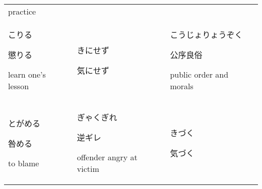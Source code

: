 \documentclass[12pt, a4j, landscape, dvipdfmx]{utarticle}
\begin{document}
\begin{minipage}[t][0pt]{\linewidth }
\begin{tabular}{||p{5.5cm}||p{5.5cm}||p{5.5cm}||}
            {\small practice}\tabularnewline
            \hhline{|:=::=::=:|} \rule{0pt}{3ex}
            \hspace*{-.4cm} {\LARGE こりる}\newline
            \rule{0pt}{3ex} \hspace*{.4cm} {\small
            懲りる}\newline \rule{0pt}{3ex} \hspace*{.425cm}
            {\small learn one's lesson}&\rule{0pt}{3ex}
            \hspace*{-.4cm} {\LARGE きにせず}\newline
            \rule{0pt}{3ex} \hspace*{.4cm} {\small
            気にせず}\newline \rule{0pt}{3ex} \hspace*{.425cm}
            {\small }&\rule{0pt}{3ex} \hspace*{-.4cm}
            {\LARGE こうじょりょうぞく}\newline \rule{0pt}{3ex}
            \hspace*{.4cm} {\small 公序良俗}\newline
            \rule{0pt}{3ex} \hspace*{.425cm} {\small
            public order and morals}\tabularnewline
            \hhline{|:=::=::=:|} \rule{0pt}{3ex}
            \hspace*{-.4cm} {\LARGE とがめる}\newline
            \rule{0pt}{3ex} \hspace*{.4cm} {\small
            咎める}\newline \rule{0pt}{3ex} \hspace*{.425cm}
            {\small to blame}&\rule{0pt}{3ex}
            \hspace*{-.4cm} {\LARGE ぎゃくぎれ}\newline
            \rule{0pt}{3ex} \hspace*{.4cm} {\small
            逆ギレ}\newline \rule{0pt}{3ex} \hspace*{.425cm}
            {\small
            offender angry at victim}&\rule{0pt}{3ex}
            \hspace*{-.4cm} {\LARGE きづく}\newline
            \rule{0pt}{3ex} \hspace*{.4cm} {\small
            気づく}\newline \rule{0pt}{3ex} \hspace*{.425cm}

\end{tabular}
\end{minipage}
\end{document}
